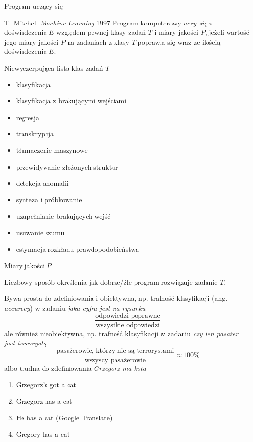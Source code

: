 \documentclass{sa}
\newcommand{\ang}[1]{(ang. \emph{#1})}
\begin{document}
\begin{frame}{Program uczący się}
\begin{block}{T. Mitchell \emph{Machine Learning} 1997}
Program komputerowy \emph{uczy się} z doświadczenia $E$ względem pewnej klasy zadań $T$ i miary jakości $P$, jeżeli wartość jego miary jakości $P$ na zadaniach z klasy $T$ poprawia się wraz ze ilością doświadczenia $E$.
\end{block}
\end{frame}

\begin{frame}{Niewyczerpująca lista klas zadań $T$}
\begin{itemize}
\item<+-> klasyfikacja
\item<+-> klasyfikacja z brakującymi wejściami
\item<+-> regresja
\item<+-> transkrypcja
\item<+-> tłumaczenie maszynowe
\item<+-> przewidywanie złożonych struktur
\item<+-> detekcja anomalii
\item<+-> synteza i próbkowanie
\item<+-> uzupełnianie brakujących wejść
\item<+-> usuwanie szumu
\item<+-> estymacja rozkładu prawdopodobieństwa
\end{itemize}
\end{frame}

\begin{frame}{Miary jakości $P$}
\begin{block}{}
Liczbowy sposób określenia jak dobrze/źle program rozwiązuje zadanie $T$.
\end{block}
Bywa prosta do zdefiniowania i obiektywna, np. trafność klasyfikacji \ang{accuracy} w zadaniu \emph{jaka cyfra jest na rysunku}
\[ \frac{\text{odpowiedzi poprawne}}{\text{wszystkie odpowiedzi}} \]
ale również nieobiektywna, np. trafność klasyfikacji w zadaniu \emph{czy ten pasażer jest terrorystą}
\[ \frac{\text{pasażerowie, którzy nie są terrorystami}}{\text{wszyscy pasażerowie}}\approx 100\% \]
albo trudna do zdefiniowania \emph{Grzegorz ma kota}
\begin{enumerate}
\item Grzegorz's got a cat
\item Grzegorz has a cat
\item He has a cat (Google Translate)
\item Gregory has a cat
\end{enumerate}
\end{frame}
\end{document}

